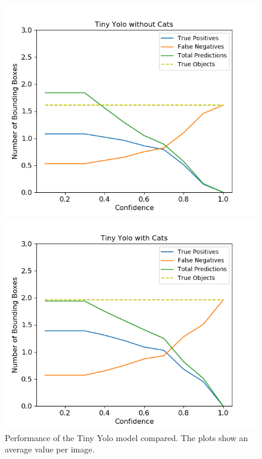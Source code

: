 \documentclass{article}
\begin{document}
\begin{figure}
\begin{minipage}{0.4\textwidth}
	\includegraphics[width=\textwidth]{fig/detections_tiny}
	\end{minipage}
	\begin{minipage}{0.4\textwidth}
		\includegraphics[width=\textwidth]{fig/detections_tiny_cats}
	\end{minipage}
	\caption{Performance of the Tiny Yolo model compared. The plots show an average value per image.}
	\label{fig:tiny}
\end{figure} 
\end{document}
